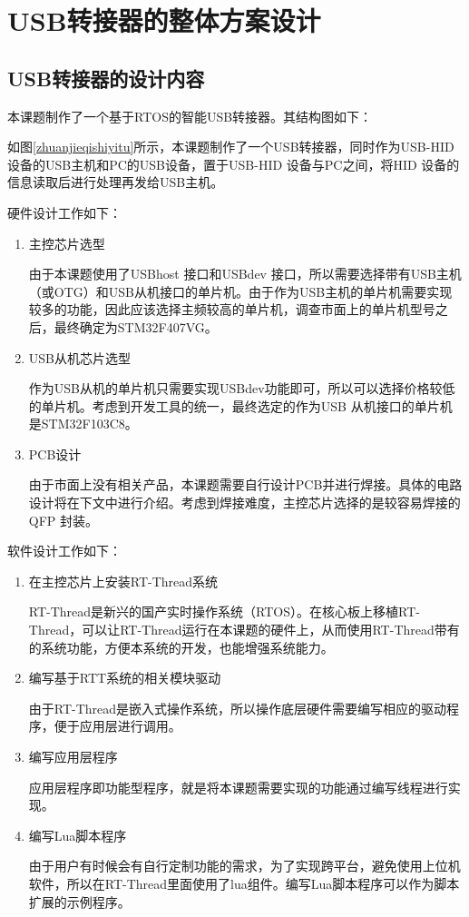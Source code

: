 
\chapter{USB转接器的整体方案设计}

\section{USB转接器的设计内容}
本课题制作了一个基于RTOS的智能USB转接器。其结构图如下：


如图\ref{zhuanjieqishiyitu}所示，本课题制作了一个USB转接器，同时作为USB-HID设备的USB主机和PC的USB设备，置于USB-HID 设备与PC之间，将HID 设备的信息读取后进行处理再发给USB主机。

硬件设计工作如下：

\begin{enumerate}
\item 主控芯片选型

由于本课题使用了USBhost 接口和USBdev 接口，所以需要选择带有USB主机（或\gls{OTG}）和USB从机接口的单片机。由于作为USB主机的单片机需要实现较多的功能，因此应该选择主频较高的单片机，调查市面上的单片机型号之后，最终确定为STM32F407VG。

\item USB从机芯片选型

作为USB从机的单片机只需要实现USBdev功能即可，所以可以选择价格较低的单片机。考虑到开发工具的统一，最终选定的作为USB 从机接口的单片机是STM32F103C8。


\item PCB设计

由于市面上没有相关产品，本课题需要自行设计PCB并进行焊接。具体的电路设计将在下文中进行介绍。考虑到焊接难度，主控芯片选择的是较容易焊接的QFP 封装。
\end{enumerate}
软件设计工作如下：
\begin{enumerate}
\item 在主控芯片上安装RT-Thread系统

RT-Thread是新兴的国产实时操作系统（RTOS）。在核心板上移植RT-Thread，可以让RT-Thread运行在本课题的硬件上，从而使用RT-Thread带有的系统功能，方便本系统的开发，也能增强系统能力。

\item 编写基于RTT系统的相关模块驱动

由于RT-Thread是嵌入式操作系统，所以操作底层硬件需要编写相应的驱动程序，便于应用层进行调用。

\item 编写应用层程序

应用层程序即功能型程序，就是将本课题需要实现的功能通过编写线程进行实现。


\item 编写Lua脚本程序

由于用户有时候会有自行定制功能的需求，为了实现跨平台，避免使用上位机软件，所以在RT-Thread里面使用了lua组件。编写Lua脚本程序可以作为脚本扩展的示例程序。

\end{enumerate}


